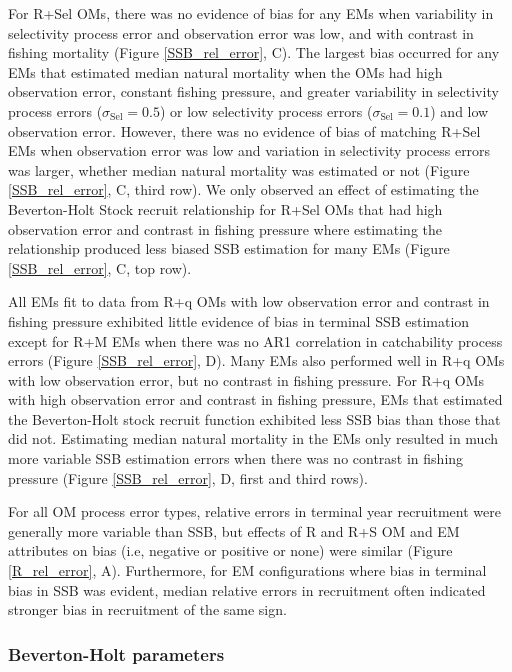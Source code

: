 \documentclass[
  12pt,
]{article}
\begin{document}
For R+Sel OMs, there was no evidence of bias for any EMs when
variability in selectivity process error and observation error was low,
and with contrast in fishing mortality (Figure \ref{SSB_rel_error}, C).
The largest bias occurred for any EMs that estimated median natural
mortality when the OMs had high observation error, constant fishing
pressure, and greater variability in selectivity process errors
(\(\sigma_{\text{Sel}} = 0.5\)) or low selectivity process errors
(\(\sigma_{\text{Sel}} = 0.1\)) and low observation error. However,
there was no evidence of bias of matching R+Sel EMs when observation
error was low and variation in selectivity process errors was larger,
whether median natural mortality was estimated or not (Figure
\ref{SSB_rel_error}, C, third row). We only observed an effect of
estimating the Beverton-Holt Stock recruit relationship for R+Sel OMs
that had high observation error and contrast in fishing pressure where
estimating the relationship produced less biased SSB estimation for many
EMs (Figure \ref{SSB_rel_error}, C, top row).

All EMs fit to data from R+q OMs with low observation error and contrast
in fishing pressure exhibited little evidence of bias in terminal SSB
estimation except for R+M EMs when there was no AR1 correlation in
catchability process errors (Figure \ref{SSB_rel_error}, D). Many EMs
also performed well in R+q OMs with low observation error, but no
contrast in fishing pressure. For R+q OMs with high observation error
and contrast in fishing pressure, EMs that estimated the Beverton-Holt
stock recruit function exhibited less SSB bias than those that did not.
Estimating median natural mortality in the EMs only resulted in much
more variable SSB estimation errors when there was no contrast in
fishing pressure (Figure \ref{SSB_rel_error}, D, first and third rows).

For all OM process error types, relative errors in terminal year
recruitment were generally more variable than SSB, but effects of R and
R+S OM and EM attributes on bias (i.e, negative or positive or none)
were similar (Figure \ref{R_rel_error}, A). Furthermore, for EM
configurations where bias in terminal bias in SSB was evident, median
relative errors in recruitment often indicated stronger bias in
recruitment of the same sign.

\hypertarget{beverton-holt-parameters}{%
\subsubsection*{Beverton-Holt
parameters}\label{beverton-holt-parameters}}
\end{document}
